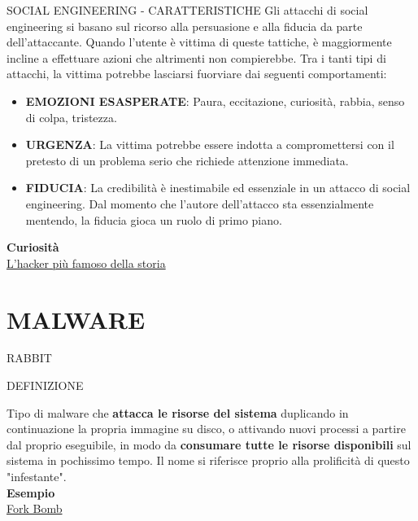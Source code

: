\documentclass[aspectratio=1610]{beamer}
\begin{document}
\begin{frame}{SOCIAL ENGINEERING - CARATTERISTICHE}
    Gli attacchi di social engineering si basano sul ricorso alla persuasione e alla fiducia da parte 
    dell'attaccante. Quando l'utente è vittima di queste tattiche, è maggiormente incline a effettuare 
    azioni che altrimenti non compierebbe. Tra i tanti tipi di attacchi, la vittima potrebbe lasciarsi fuorviare dai 
    seguenti comportamenti:
    \begin{itemize}
        \item \textbf{EMOZIONI ESASPERATE}: Paura, eccitazione, curiosità, rabbia, senso di colpa, tristezza.
        \pause
        \item \textbf{URGENZA}: La vittima potrebbe essere indotta a compromettersi con il pretesto di un problema 
        serio che richiede attenzione immediata.
        \pause
        \item \textbf{FIDUCIA}: La credibilità è inestimabile ed essenziale in un attacco di social engineering. 
        Dal momento che l'autore dell'attacco sta essenzialmente mentendo, la fiducia gioca un ruolo di primo piano.
    \end{itemize}
    \tiny{\textbf{Curiosità}}\\
    \tiny{\href{https://it.wikipedia.org/wiki/Kevin_Mitnick}{L'hacker più famoso della storia}}
\end{frame}

\section{MALWARE}

\begin{frame}{RABBIT}
    \begin{alertblock}{DEFINIZIONE}
        \begin{minipage}{0.98\linewidth}
            \justifying
            Tipo di malware che \textbf{attacca le risorse del sistema} duplicando in continuazione la propria 
            immagine su disco, o attivando nuovi processi a partire dal proprio eseguibile, 
            in modo da \textbf{consumare tutte le risorse disponibili} sul sistema in pochissimo tempo. 
            Il nome si riferisce proprio alla prolificità di questo "infestante".\\
            \bigskip
            \tiny{\textbf{Esempio}}\\
            \tiny{\href{https://it.wikipedia.org/wiki/Fork_bomb}{Fork Bomb}}
        \end{minipage}
    \end{alertblock}
\end{frame}
\end{document}
